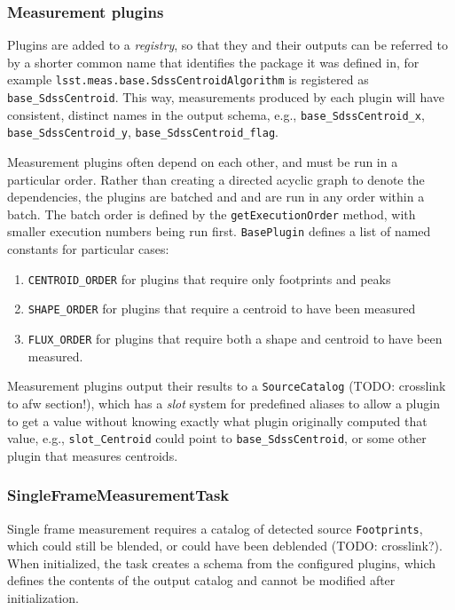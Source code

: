 \subsubsection{Measurement plugins}
\label{sec:plugins}

Plugins are added to a \textit{registry}, so that they and their outputs can be referred to by a shorter common name that identifies the package it was defined in, for example \texttt{lsst.meas.base.SdssCentroidAlgorithm} is registered as \texttt{base\_SdssCentroid}.
This way, measurements produced by each plugin will have consistent, distinct names in the output schema, e.g., \texttt{base\_SdssCentroid\_x}, \texttt{base\_SdssCentroid\_y}, \texttt{base\_SdssCentroid\_flag}.

Measurement plugins often depend on each other, and must be run in a particular order.
Rather than creating a directed acyclic graph to denote the dependencies, the plugins are batched and and are run in any order within a batch.
The batch order is defined by the \texttt{getExecutionOrder} method, with smaller execution numbers being run first.
\texttt{BasePlugin} defines a list of named constants for particular cases:
\begin{enumerate}
    \item \texttt{CENTROID\_ORDER} for plugins that require only footprints and peaks
    \item \texttt{SHAPE\_ORDER} for plugins that require a centroid to have been measured
    \item \texttt{FLUX\_ORDER} for plugins that require both a shape and centroid to have been measured.
\end{enumerate}

Measurement plugins output their results to a \texttt{SourceCatalog} (TODO: crosslink to afw section!), which has a \textit{slot} system for predefined aliases to allow a plugin to get a value without knowing exactly what plugin originally computed that value, e.g., \texttt{slot\_Centroid} could point to \texttt{base\_SdssCentroid}, or some other plugin that measures centroids.

\subsubsection{SingleFrameMeasurementTask}
\label{sec:SingleFrameMeasurementTask}

Single frame measurement requires a catalog of detected source \texttt{Footprints}, which could still be blended, or could have been deblended (TODO: crosslink?).
When initialized, the task creates a schema from the configured plugins, which defines the contents of the output catalog and cannot be modified after initialization.

